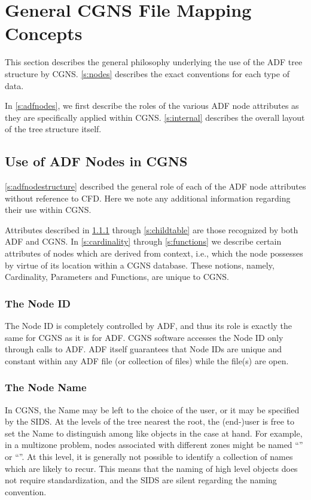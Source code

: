 \section{General CGNS File Mapping Concepts}
\label{s:general}
\thispagestyle{plain}

This section describes the general philosophy underlying the use of
the ADF tree structure by CGNS. \autoref{s:nodes} describes the exact
conventions for each type of data.

In \autoref{s:adfnodes}, we first describe the roles of the various
ADF node attributes as they are specifically applied within CGNS.
\autoref{s:internal} describes the overall layout of the tree
structure itself.

\subsection{Use of ADF Nodes in CGNS}
\label{s:adfnodes}

\autoref{s:adfnodestructure} described the general role of each of
the ADF node attributes without reference to CFD.  Here we note any
additional information regarding their use within CGNS.

Attributes described in \ref*{s:nodeid} through \ref*{s:childtable} are
those recognized by both ADF and CGNS. In \ref*{s:cardinality} through
\ref*{s:functions} we describe certain attributes of nodes which are
derived from context, i.e., which the node possesses by virtue of its
location within a CGNS database. These notions, namely, Cardinality,
Parameters and Functions, are unique to CGNS.

\subsubsection{The Node ID}
\label{s:nodeid}

The Node ID is completely controlled by ADF, and thus its role is
exactly the same for CGNS as it is for ADF. CGNS software accesses the
Node ID only through calls to ADF. ADF itself guarantees that Node IDs
are unique and constant within any ADF file (or collection of files)
while the file(s) are open.

\subsubsection{The Node Name}

In CGNS, the Name may be left to the choice of the user, or it may be
specified by the SIDS. At the levels of the tree nearest the root,
the (end-)user is free to set the Name to distinguish among like
objects in the case at hand. For example, in a multizone problem, nodes
associated with different zones might be named ``''
or ``''. At this level, it is generally
not possible to identify a collection of names which are likely to
recur. This means that the naming of high level objects does not
require standardization, and the SIDS are silent regarding the naming
convention.

